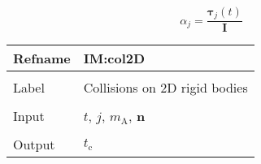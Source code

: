 \documentclass[12pt]{article}
\begin{document}
\begin{displaymath}
{α_{j}}=\frac{{\symbf{τ}_{j}}\left(t\right)}{\symbf{I}}
\end{displaymath}
\vspace{\baselineskip}
\noindent
\begin{minipage}{\textwidth}
\begin{tabular}{>{\raggedright}p{}>{\raggedright\arraybackslash}p{}}
\toprule \textbf{Refname} & \textbf{IM:col2D}
\label{IM:col2D}
\\ \midrule \\
Label & Collisions on 2D rigid bodies
        
\\ \midrule \\
Input & $t$, $j$, ${m_{\text{A}}}$, $\symbf{n}$
        
\\ \midrule \\
Output & ${t_{\text{c}}}$
         

\end{tabular}
\end{minipage}
\end{document}
